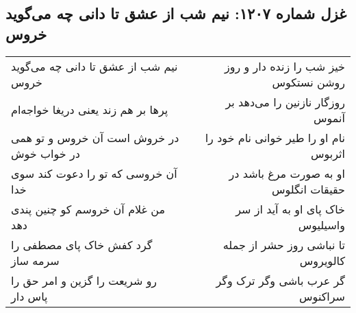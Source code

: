 \begin{center}
\section*{غزل شماره ۱۲۰۷: نیم شب از عشق تا دانی چه می‌گوید خروس}
\label{sec:1207}
\begin{longtable}{l p{0.5cm} r}
نیم شب از عشق تا دانی چه می‌گوید خروس
&&
خیز شب را زنده دار و روز روشن نستکوس
\\
پرها بر هم زند یعنی دریغا خواجه‌ام
&&
روزگار نازنین را می‌دهد بر آنموس
\\
در خروش است آن خروس و تو همی در خواب خوش
&&
نام او را طیر خوانی نام خود را اثربوس
\\
آن خروسی که تو را دعوت کند سوی خدا
&&
او به صورت مرغ باشد در حقیقات انگلوس
\\
من غلام آن خروسم کو چنین پندی دهد
&&
خاک پای او به آید از سر واسیلیوس
\\
گرد کفش خاک پای مصطفی را سرمه ساز
&&
تا نباشی روز حشر از جمله کالویروس
\\
رو شریعت را گزین و امر حق را پاس دار
&&
گر عرب باشی وگر ترک وگر سراکنوس
\\
\end{longtable}
\end{center}
